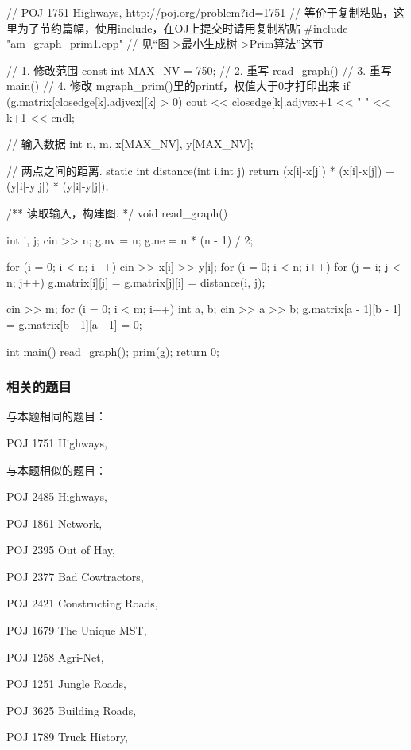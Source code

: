 \begin{Codex}[label=highways.cpp]
    // POJ 1751 Highways, http://poj.org/problem?id=1751
    // 等价于复制粘贴，这里为了节约篇幅，使用include，在OJ上提交时请用复制粘贴
    #include "am_graph_prim1.cpp"  // 见“图->最小生成树->Prim算法”这节

    // 1. 修改范围
    const int MAX_NV = 750;
    // 2. 重写 read_graph()
    // 3. 重写 main()
    // 4. 修改 mgraph_prim()里的printf，权值大于0才打印出来
    if (g.matrix[closedge[k].adjvex][k] > 0)
        cout << closedge[k].adjvex+1 << " " << k+1 << endl;

    // 输入数据
    int n, m, x[MAX_NV], y[MAX_NV];

    // 两点之间的距离.
    static int distance(int i,int j) {
        return (x[i]-x[j]) * (x[i]-x[j]) + (y[i]-y[j]) * (y[i]-y[j]);
    }

    /** 读取输入，构建图. */
    void read_graph() {
        int i, j;
        cin >> n;
        g.nv = n;
        g.ne = n * (n - 1) / 2;

        for (i = 0; i < n; i++)
            cin >> x[i] >> y[i];
        for (i = 0; i < n; i++)
            for (j = i; j < n; j++)
                g.matrix[i][j] = g.matrix[j][i] = distance(i, j);

        cin >> m;
        for (i = 0; i < m; i++) {
            int a, b;
            cin >> a >> b;
            g.matrix[a - 1][b - 1] = g.matrix[b - 1][a - 1] = 0;
        }
    }

    int main() {
        read_graph();
        prim(g);
        return 0;
    }
\end{Codex}

\subsubsection{相关的题目}
与本题相同的题目：
\begindot
\item POJ 1751 Highways, 
\myenddot

与本题相似的题目：
\begindot
\item POJ 2485 Highways, 
\item POJ 1861 Network, 
\item POJ 2395 Out of Hay, 
\item POJ 2377 Bad Cowtractors, 
\item POJ 2421 Constructing Roads, 
\item POJ 1679 The Unique MST, 
\item POJ 1258 Agri-Net, 
\item POJ 1251 Jungle Roads, 
\item POJ 3625 Building Roads, 
\item POJ 1789 Truck History, 
\myenddot


